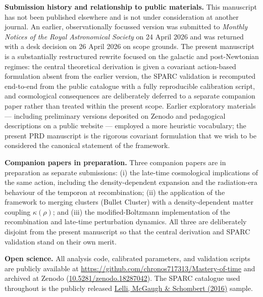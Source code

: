 \documentclass[11pt]{article}
\begin{document}
\bigskip

\textbf{Submission history and relationship to public materials.}
This manuscript has not been published elsewhere and is not under
consideration at another journal. An earlier, observationally
focussed version was submitted to \textit{Monthly Notices of the
Royal Astronomical Society} on 24 April 2026 and was returned with a
desk decision on 26 April 2026 on scope grounds. The present
manuscript is a substantially restructured rewrite focused on the
galactic and post-Newtonian regimes: the central theoretical
derivation is given a covariant action-based formulation absent
from the earlier version, the SPARC validation is recomputed
end-to-end from the public catalogue with a fully reproducible
calibration script, and cosmological consequences are deliberately
deferred to a separate companion paper rather than treated within
the present scope. Earlier exploratory materials --- including
preliminary versions deposited on Zenodo and pedagogical
descriptions on a public website --- employed a more heuristic
vocabulary; the present PRD manuscript is the rigorous covariant
formulation that we wish to be considered the canonical statement
of the framework.

\bigskip

\textbf{Companion papers in preparation.}
Three companion papers are in preparation as separate submissions:
(i) the late-time cosmological implications of the same action,
including the density-dependent expansion and the radiation-era
behaviour of the temporon at recombination; (ii) the application
of the framework to merging clusters (Bullet Cluster) with a
density-dependent matter coupling $\kappa(\rho)$; and (iii) the
modified-Boltzmann implementation of the recombination and
late-time perturbation dynamics. All three are deliberately
disjoint from the present manuscript so that the central derivation
and SPARC validation stand on their own merit.

\bigskip

\textbf{Open science.}
All analysis code, calibrated parameters, and validation scripts are
publicly available at
\url{https://github.com/chronos717313/Mastery-of-time}
and archived at Zenodo
(\href{https://doi.org/10.5281/zenodo.18287042}{10.5281/zenodo.18287042}).
The SPARC catalogue used throughout is the publicly released
\href{http://astroweb.cwru.edu/SPARC/}{Lelli, McGaugh \& Schombert (2016)} sample.

\bigskip
\end{document}
